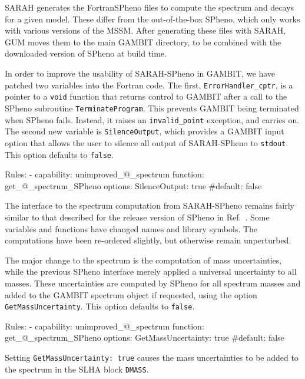 \documentclass[pdftex,twocolumn,epjc3_preprint,runningheads]{svjour3}
\renewcommand{\_}{\discretionary{\underscore}{}{\underscore}}
\newcommand\cpp[1]{{\lstinline!#1!}}  %
\newcommand\yaml[1]{{\lstset{style=yaml}\lstinline!#1!\lstset{style=cpp}}}
\newcommand\term[1]{{\lstset{style=terminal}\lstinline!#1!\lstset{style=cpp}}}
\newcommand\fortran[1]{{\lstset{style=fortran}\lstinline!#1!\lstset{style=cpp}}}
\newcommand{\gambit}{\textsf{GAMBIT}\xspace}
\newcommand{\GB}{\gambit}
\newcommand{\gum}{\textsf{GUM}\xspace}
\newcommand{\sarah}{\textsf{SARAH}\xspace}
\newcommand{\spheno}{\textsf{SPheno}\xspace}
\newcommand\Fortran{\textsf{Fortran}\xspace}
\begin{document}
\sarah generates the \Fortran \spheno files to compute the spectrum and decays for a given model. These differ from the out-of-the-box \spheno, which only works with various versions of the MSSM. After generating these files with \sarah, \gum moves them to the main \GB directory, to be combined with the downloaded version of \spheno at build time.

In order to improve the usability of \sarah-\spheno in \GB, we have patched two variables into the \Fortran code. The first, \fortran{ErrorHandler_cptr}, is a pointer to a \cpp{void} function that returns control to \GB after a call to the \spheno subroutine \fortran{TerminateProgram}. This prevents \GB being terminated when \spheno fails. Instead, it raises an \cpp{invalid_point} exception, and carries on. The second new variable is \fortran{SilenceOutput}, which provides a \GB input option that allows the user to silence all output of \sarah-\spheno to \term{stdout}.  This option defaults to \yaml{false}.
%
\begin{lstyaml}
Rules:
  - capability: unimproved_@\nm@_spectrum
    function: get_@\nm@_spectrum_SPheno
    options:
      SilenceOutput: true #default: false
\end{lstyaml}
%

The interface to the spectrum computation from \sarah-\spheno remains fairly similar to that described for the release version of \spheno in Ref.\ \cite{SDPBit}. Some variables and functions have changed names and library symbols.  The computations have been re-ordered slightly, but otherwise remain unperturbed.

The major change to the spectrum is the computation of mass uncertainties, while the previous \spheno interface merely applied a universal uncertainty to all masses.  These uncertainties are computed by \spheno for all spectrum masses and added to the \GB spectrum object if requested, using the option \fortran{GetMassUncertainty}.  This option defaults to \yaml{false}.
%
\begin{lstyaml}
Rules:
  - capability: unimproved_@\nm@_spectrum
    function: get_@\nm@_spectrum_SPheno
    options:
      GetMassUncertainty: true #default: false
\end{lstyaml}
%
Setting \yaml{GetMassUncertainty: true} causes the mass uncertainties to be added to the spectrum in the SLHA block \term{DMASS}.
\end{document}
